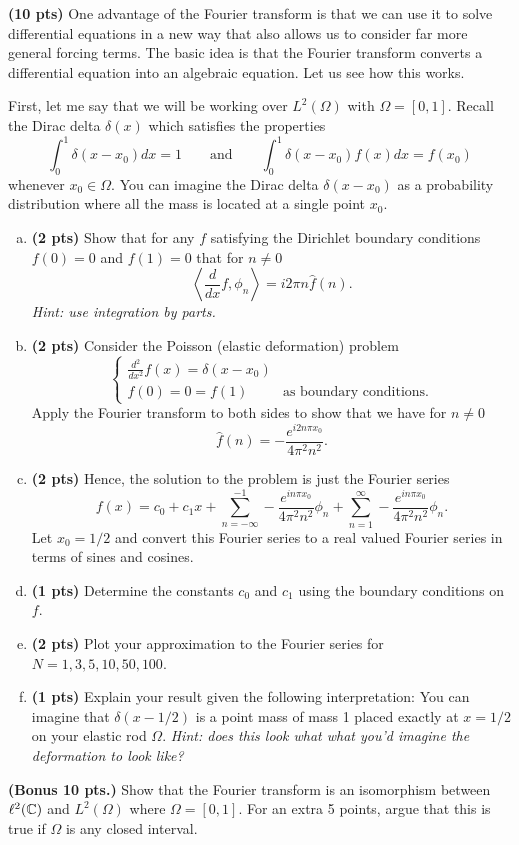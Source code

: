 \documentclass[12pt]{article} %
\begin{document}
\vspace*{1cm}
\begin{problem}
\textbf{(10 pts)} One advantage of the Fourier transform is that we can use it to solve differential equations in a new way that also allows us to consider far more general forcing terms. The basic idea is that the Fourier transform converts a differential equation into an algebraic equation. Let us see how this works.

First, let me say that we will be working over $L^2(\Omega)$ with $\Omega = [0,1]$. Recall the Dirac delta $\delta(x)$ which satisfies the properties
\[
\int_0^1 \delta(x-x_0) dx = 1 \qquad \textrm{and} \qquad \int_0^1 \delta(x-x_0) f(x) dx = f(x_0)
\]
whenever $x_0 \in \Omega$. You can imagine the Dirac delta $\delta(x- x_0)$ as a probability distribution where all the mass is located at a single point $x_0$.
\begin{enumerate}[(a)]
\item \textbf{(2 pts)} Show that for any $f$ satisfying the Dirichlet boundary conditions $f(0)=0$ and $f(1)=0$ that for $n\neq 0$
\[
\left\langle \frac{d}{dx} f , \phi_n \right\rangle = i2 \pi n \hat{f}(n).
\]
\emph{Hint: use integration by parts.}
\item \textbf{(2 pts)} Consider the Poisson (elastic deformation) problem
\[
\begin{cases}
\frac{d^2}{dx^2} f(x) = \delta(x-x_0) \\
f(0)=0=f(1) & \textrm{as boundary conditions.}
\end{cases}
\]
Apply the Fourier transform to both sides to show that we have for $n\neq 0$
\[
\hat{f}(n) =  -\frac{e^{i2n\pi x_0}}{4\pi^2 n^2}.
\]
\item \textbf{(2 pts)} Hence, the solution to the problem is just the Fourier series
\[
f(x)=c_0 + c_1 x + \sum_{n=-\infty}^{-1} -\frac{e^{in \pi x_0}}{4\pi^2 n^2} \phi_n + \sum_{n=1}^\infty -\frac{e^{in \pi x_0}}{4\pi^2 n^2} \phi_n.
\]
Let $x_0=1/2$ and convert this Fourier series to a real valued Fourier series in terms of sines and cosines. 
\item \textbf{(1 pts)} Determine the constants $c_0$ and $c_1$ using the boundary conditions on $f$.
\item \textbf{(2 pts)} Plot your approximation to the Fourier series for $N=1,3,5,10,50,100$. 
\item \textbf{(1 pts)} Explain your result given the following interpretation: You can imagine that $\delta(x-1/2)$ is a point mass of mass 1 placed exactly at $x=1/2$ on your elastic rod $\Omega$. \emph{Hint: does this look what what you'd imagine the deformation to look like?}
\end{enumerate}
\end{problem}


\begin{problem}
\textbf{(Bonus 10 pts.)} Show that the Fourier transform is an isomorphism between $\ell^2(\mathbb{C})$ and $L^2(\Omega)$ where $\Omega=[0,1]$. For an extra 5 points, argue that this is true if $\Omega$ is any closed interval.
\end{problem}
\end{document}
